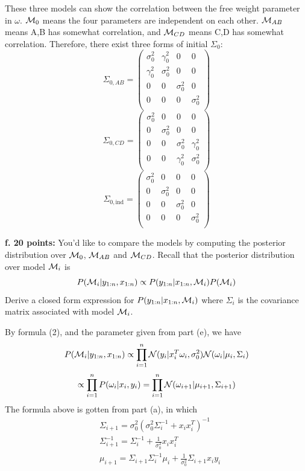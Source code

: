 \documentclass[letterpaper,10pt]{article}
\newcommand{\Mc}{{\cal M}}
\newcommand{\Nc}{{\cal N}}
\begin{document}
These three models can show the correlation between the free weight parameter in $\omega$. $\Mc_0$ means the four parameters are independent on each other.  $\Mc_{AB}$ means A,B has somewhat correlation, and  $\Mc_{CD}$ means C,D has somewhat correlation.
Therefore, there exist three forms of initial $\Sigma_0$:
$$
\Sigma_{0, AB} =
\left(
  \begin{array}{cccc}
    \sigma_0^2 & \gamma_0^2 & 0 & 0 \\
     \gamma_0^2 & \sigma_0^2 & 0 & 0\\
     0 & 0 & \sigma_0^2 & 0 \\
     0 & 0 & 0 & \sigma_0^2 \\
  \end{array}
\right)
$$
$$
\Sigma_{0, CD} =
\left(
  \begin{array}{cccc}
    \sigma_0^2 & 0 & 0 & 0 \\
     0 & \sigma_0^2 & 0 & 0\\
     0 & 0 & \sigma_0^2 & \gamma_0^2 \\
     0 & 0 & \gamma_0^2 & \sigma_0^2 \\
  \end{array}
\right)
$$
$$
\Sigma_{0, \text{ind}} =
\left(
  \begin{array}{cccc}
     \sigma_0^2 & 0 & 0 & 0 \\
     0 & \sigma_0^2 & 0 & 0 \\
     0 & 0 & \sigma_0^2 & 0 \\
     0 & 0 & 0 & \sigma_0^2 \\
  \end{array}
\right)
$$
\begin{framed}
\textbf{f. 20 points:} You'd like to compare the models by computing the posterior distribution over $\Mc_0$, $\Mc_{AB}$ and $\Mc_{CD}$. Recall that the posterior distribution over model $\Mc_i$ is
\begin{equation}\label{}
P(\Mc_i| y_{1:n}, x_{1:n}) \propto P(y_{1:n}| x_{1:n}, \Mc_i) P (\Mc_i)
\end{equation}
Derive a closed form expression for $P(y_{1:n}| x_{1:n}, \Mc_i)$ where $\Sigma_i$ is the covariance matrix associated with model $\Mc_i$.
\end{framed}

By formula (2), and the parameter given from part (e), we have
$$
P(\Mc_i| y_{1:n}, x_{1:n}) \propto \prod_{i=1}^{n} \Nc (y_i | x_i^T \omega_i, \sigma_0^2) \Nc(\omega_i| \mu_i, \Sigma_i)
$$
$$
\propto \prod_{i=1}^{n} P (\omega_i | x_i, y_i ) =  \prod_{i=1}^{n} \Nc(\omega_{i+1}| \mu_{i+1}, \Sigma_{i+1})
$$
The formula above is gotten from part (a), in which
\begin{align*}
 & \Sigma_{i+1} = \sigma_0^2 ( \sigma_0^2 \Sigma_i^{-1} + x_i x_i^T)^{-1} \\
 & \Sigma_{i+1}^{-1} = \Sigma_i^{-1} + \frac{1}{\sigma_0^2} x_i x_i^T \\
 & \mu_{i+1} = \Sigma_{i+1} \Sigma_{i}^{-1} \mu_i + \frac{1}{\sigma_0^2} \Sigma_{i+1} x_i y_i
\end{align*}
\end{document}
